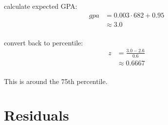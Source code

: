 \documentclass[letterpaper, landscape]{exam}
\begin{document}
\begin{enumerate}[(a)]
\begin{solution}
        calculate expected GPA:\@ 
        \begin{align*}
          gpa & = 0.003 \cdot 682 + 0.95 \\
              & \approx 3.0 \\
        \end{align*}

        convert back to percentile:
        \begin{align*}
          z & = \frac{3.0 - 2.6}{0.6} \\
            & \approx 0.6667 \\
        \end{align*}

        This is around the 75th percentile.

      \end{solution}
  \end{enumerate}

  \section{Residuals}
\end{document}
